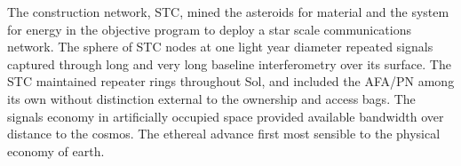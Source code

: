 

The construction network, STC, mined the asteroids for material and
the system for energy in the objective program to deploy a star scale
communications network.  The sphere of STC nodes at one light year
diameter repeated signals captured through long and very long baseline
interferometry over its surface.  The STC maintained repeater rings
throughout Sol, and included the AFA/PN among its own without
distinction external to the ownership and access bags.  The signals
economy in artificially occupied space provided available bandwidth
over distance to the cosmos.  The ethereal advance first most sensible
to the physical economy of earth.

\bye
